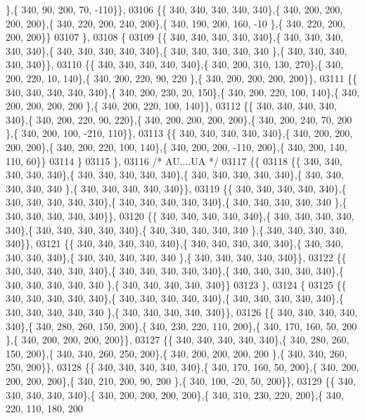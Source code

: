 \begin{DoxyCode}
      \},\{ 340,  90, 200,  70, -110\}\},
03106 \{\{ 340, 340, 340, 340, 340\},\{ 340, 200, 200, 200, 200\},\{ 340, 220, 200, 240, 200\},\{ 340, 190, 200, 160, -10
      \},\{ 340, 220, 200, 200, 200\}\}
03107 \},
03108 \{
03109 \{\{ 340, 340, 340, 340, 340\},\{ 340, 340, 340, 340, 340\},\{ 340, 340, 340, 340, 340\},\{ 340, 340, 340, 340, 340
      \},\{ 340, 340, 340, 340, 340\}\},
03110 \{\{ 340, 340, 340, 340, 340\},\{ 340, 200, 310, 130, 270\},\{ 340, 200, 220,  10, 140\},\{ 340, 200, 220,  90, 220
      \},\{ 340, 200, 200, 200, 200\}\},
03111 \{\{ 340, 340, 340, 340, 340\},\{ 340, 200, 230,  20, 150\},\{ 340, 200, 220, 100, 140\},\{ 340, 200, 200, 200, 200
      \},\{ 340, 200, 220, 100, 140\}\},
03112 \{\{ 340, 340, 340, 340, 340\},\{ 340, 200, 220,  90, 220\},\{ 340, 200, 200, 200, 200\},\{ 340, 200, 240,  70, 200
      \},\{ 340, 200, 100, -210, 110\}\},
03113 \{\{ 340, 340, 340, 340, 340\},\{ 340, 200, 200, 200, 200\},\{ 340, 200, 220, 100, 140\},\{ 340, 200, 200, -110, 
      200\},\{ 340, 200, 140, 110,  60\}\}
03114 \}
03115 \},
03116 \textcolor{comment}{/* AU....UA */}
03117 \{\{
03118 \{\{ 340, 340, 340, 340, 340\},\{ 340, 340, 340, 340, 340\},\{ 340, 340, 340, 340, 340\},\{ 340, 340, 340, 340, 340
      \},\{ 340, 340, 340, 340, 340\}\},
03119 \{\{ 340, 340, 340, 340, 340\},\{ 340, 340, 340, 340, 340\},\{ 340, 340, 340, 340, 340\},\{ 340, 340, 340, 340, 340
      \},\{ 340, 340, 340, 340, 340\}\},
03120 \{\{ 340, 340, 340, 340, 340\},\{ 340, 340, 340, 340, 340\},\{ 340, 340, 340, 340, 340\},\{ 340, 340, 340, 340, 340
      \},\{ 340, 340, 340, 340, 340\}\},
03121 \{\{ 340, 340, 340, 340, 340\},\{ 340, 340, 340, 340, 340\},\{ 340, 340, 340, 340, 340\},\{ 340, 340, 340, 340, 340
      \},\{ 340, 340, 340, 340, 340\}\},
03122 \{\{ 340, 340, 340, 340, 340\},\{ 340, 340, 340, 340, 340\},\{ 340, 340, 340, 340, 340\},\{ 340, 340, 340, 340, 340
      \},\{ 340, 340, 340, 340, 340\}\}
03123 \},
03124 \{
03125 \{\{ 340, 340, 340, 340, 340\},\{ 340, 340, 340, 340, 340\},\{ 340, 340, 340, 340, 340\},\{ 340, 340, 340, 340, 340
      \},\{ 340, 340, 340, 340, 340\}\},
03126 \{\{ 340, 340, 340, 340, 340\},\{ 340, 280, 260, 150, 200\},\{ 340, 230, 220, 110, 200\},\{ 340, 170, 160,  50, 200
      \},\{ 340, 200, 200, 200, 200\}\},
03127 \{\{ 340, 340, 340, 340, 340\},\{ 340, 280, 260, 150, 200\},\{ 340, 340, 260, 250, 200\},\{ 340, 200, 200, 200, 200
      \},\{ 340, 340, 260, 250, 200\}\},
03128 \{\{ 340, 340, 340, 340, 340\},\{ 340, 170, 160,  50, 200\},\{ 340, 200, 200, 200, 200\},\{ 340, 210, 200,  90, 200
      \},\{ 340, 100, -20,  50, 200\}\},
03129 \{\{ 340, 340, 340, 340, 340\},\{ 340, 200, 200, 200, 200\},\{ 340, 310, 230, 220, 200\},\{ 340, 220, 110, 180, 200

\end{DoxyCode}
